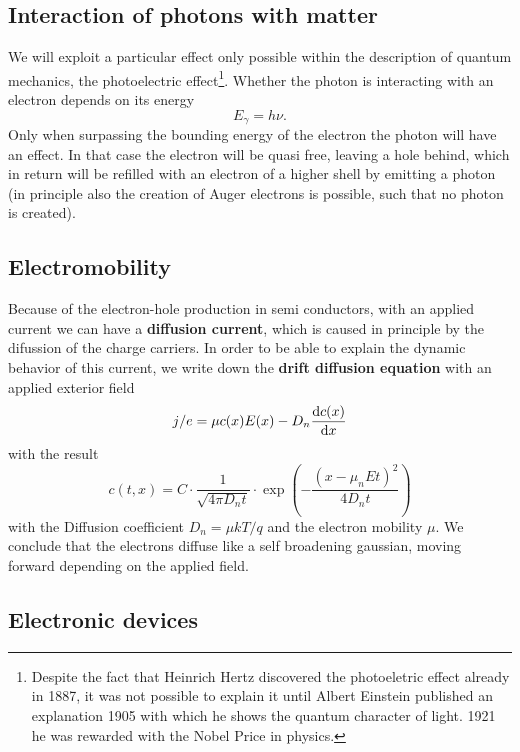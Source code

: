 \subsection{Interaction of photons with matter}
We will exploit a particular effect only possible within the description of quantum mechanics, the
photoelectric effect\footnote{Despite the fact that Heinrich Hertz discovered the 
photoeletric effect already in 1887, it was not possible to explain it until Albert Einstein
published an explanation 1905 with which he shows the quantum character
of light. 1921 he was rewarded with the Nobel Price in physics.}. 
Whether the photon is interacting with an electron depends on its energy
\begin{equation}
    E_\gamma = h \nu.
\end{equation}
Only when surpassing the bounding energy of the electron the photon will have an effect. In that
case the electron will be quasi free, leaving a hole behind, which in return will be refilled with
an electron of a higher shell by emitting a photon (in principle also the creation of Auger electrons is
possible, such that no photon is created). 
\subsection{Electromobility}
Because of the electron-hole production in semi conductors, with an applied current we can have 
a \textbf{diffusion current}, which is caused in principle by the difussion of the charge carriers. In
order to be able to explain the dynamic behavior of this current, we write down the
\textbf{drift diffusion equation} with an applied exterior field
\begin{align}
    j/e =  \mu c(x) E(x) -  D_n \frac{\mathrm{d} c(x) }{\mathrm{d} x}  \\
\end{align}
with the result
\begin{equation}
    c(t, x) = C \cdot \frac{1}{\sqrt{4 \pi D_n t}} 
    \cdot \exp\left( -\frac{\left( x - \mu_n E t \right)^2}{4 D_n t} \right)
    \label{eq:c_t_x}
\end{equation}
with the Diffusion coefficient $D_n = \mu kT /q $ and the electron mobility $\mu$.
We conclude that the electrons diffuse like a self broadening gaussian, moving forward depending on 
the applied field.

\subsection{Electronic devices}
